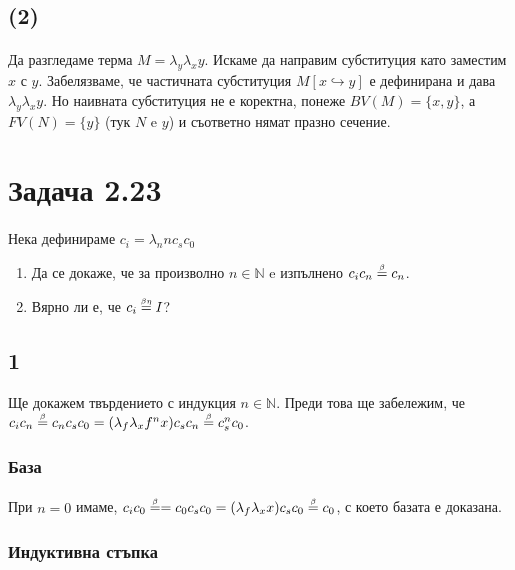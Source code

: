 \documentclass[12pt]{article}
\begin{document}
\begin{enumerate}
\subsection*{(2)}
\paragraph*{}
Да разгледаме терма $M = \lambda_y \lambda_x y$. Искаме да направим субституция като заместим $x$ с $y$. Забелязваме, че частичната субституция $M[x \hookrightarrow y]$ е дефинирана и дава $\lambda_y \lambda_x y$. Но наивната субституция не е коректна, понеже $BV(M) = \{ x, y \}$, а $FV(N) = \{ y \}$ (тук $N$ e $y$) и съответно нямат празно сечение.

\end{enumerate}

\section*{Задача 2.23}
\paragraph{}
Нека дефинираме $c_i = \lambda_n n c_s c_0$
\begin{enumerate}
	\item Да се докаже, че за произволно $n \in \mathbb{N}$ e изпълнено $c_i c_n \betaeq c_n$.
	\item Вярно ли е, че $c_i \betaetaeq I$?
\end{enumerate}

\subsection*{1}
Ще докажем твърдението с индукция $n \in \mathbb{N}$. Преди това ще забележим, че $c_i c_n \betaeq c_n c_s c_0 = (\lambda_f \lambda_x f^n x) c_s c_n \betaeq c_s^n c_0 $.
\subsubsection*{База}
\paragraph*{}
При $n=0$ имаме, $c_i c_0 \betaeq = c_0 c_s c_0 = (\lambda_f \lambda_x x) c_s c_0 \betaeq c_0$, с което базата е доказана.

\subsubsection*{Индуктивна стъпка}
\end{document}
